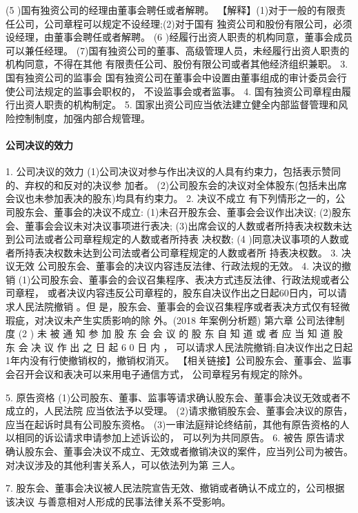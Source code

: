 \documentclass[UTF8,12pt]{ctexart}
\numberwithin{equation}{section} %
\numberwithin{figure}{section}
\numberwithin{table}{section}
\begin{document}
	(5 )国有独资公司的经理由董事会聘任或者解聘。 【解释】(1)对于一般的有限责任公司，公司章程可以规定不设经理;(2)对于国有 独资公司和股份有限公司，必须设经理，由董事会聘任或者解聘。
	(6 )经履行出资人职责的机构同意，董事会成员可以兼任经理。 (7)国有独资公司的董事、高级管理人员，未经履行出资人职责的机构同意，不得在其他 有限责任公司、股份有限公司或者其他经济组织兼职。
	3. 国有独资公司的监事会 国有独资公司在董事会中设置由董事组成的审计委员会行使公司法规定的监事会职权的，
	不设监事会或者监事。
	4. 国有独资公司章程由履行出资人职责的机构制定。
	5. 国家出资公司应当依法建立健全内部监督管理和风险控制制度，加强内部合规管理。
	
	\paragraph{公司决议的效力}
	1. 公司决议的效力 (1)公司决议对参与作出决议的人具有约束力，包括表示赞同的、弃权的和反对的决议参 加者。 (2)公司股东会的决议对全体股东(包括未出席会议也未参加表决的股东)均具有约束力。
	2. 决议不成立
	有下列情形之一的，公司股东会、董事会的决议不成立: (1)未召开股东会、董事会会议作出决议; (2)股东会、董事会会议未对决议事项进行表决; (3)出席会议的人数或者所持表决权数未达到公司法或者公司章程规定的人数或者所持表 决权数;
	(4 )同意决议事项的人数或者所持表决权数未达到公司法或者公司章程规定的人数或者所 持表决权数。
	3. 决议无效
	公司股东会、董事会的决议内容违反法律、行政法规的无效。
	4. 决议的撤销 (1)公司股东会、董事会的会议召集程序、表决方式违反法律、行政法规或者公司章程， 或者决议内容违反公司章程的，股东自决议作出之日起60日内，可以请求人民法院撤销 。但 是，股东会、董事会的会议召集程序或者表决方式仅有轻微瑕疵，对决议未产生实质影响的除 外。(2018 年案例分析题)
	第六章 公司法律制度 (2 ) 未 被 通 知 参 加 股 东 会 会 议 的 股 东 自 知 道 或 者 应 当 知 道 股 东 会 决 议 作 出 之 日 起 6 0 日 内 ， 可以请求人民法院撤销;自决议作出之日起1年内没有行使撤销权的，撤销权消灭。 【相关链接】公司股东会、董事会、监事会召开会议和表决可以来用电子通信方式， 公司章程另有规定的除外。
	
	5. 原告资格 (1)公司股东、董事、监事等请求确认股东会、董事会决议无效或者不成立的，人民法院 应当依法予以受理。 (2)请求撤销股东会、董事会决议的原告，应当在起诉时具有公司股东资格。 (3)一审法庭辩论终结前，其他有原告资格的人以相同的诉讼请求申请参加上述诉讼的， 可以列为共同原告。
	6. 被告 原告请求确认股东会、董事会决议不成立、无效或者撤销决议的案件，应当列公司为被告。 对决议涉及的其他利害关系人，可以依法列为第 三人。
	
	7. 股东会、董事会决议被人民法院宣告无效、撤销或者确认不成立的，公司根据该决议 与善意相对人形成的民事法律关系不受影响。
\end{document}

